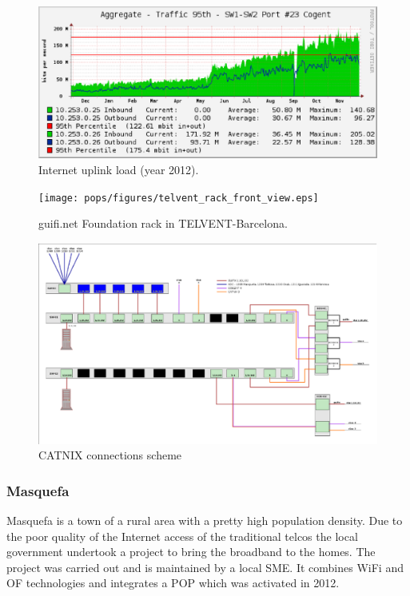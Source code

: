 \begin{figure}[htbp]
  \centering
  \includegraphics[scale=.65]{pops/figures/cogent_network_load2.eps} 
  \caption{Internet uplink load (year 2012).}
  \label{fig:cogent_load}
\end{figure}


\begin{figure}[htbp]
  \centering
  \texttt{[image: pops/figures/telvent\_rack\_front\_view.eps]} 
  \caption{guifi.net Foundation rack in TELVENT-Barcelona.}
  \label{fig:telvent_rack}
\end{figure}


\begin{figure}[htbp]
  \centering
  \includegraphics[scale=.75]{pops/figures/telvent_scheme.eps} 
  \caption{CATNIX connections scheme}
  \label{fig:telvent_scheme}
\end{figure}



\FloatBarrier
\subsubsection{Masquefa}

Masquefa is a town of a rural area with a pretty high population density. Due to the poor quality of the Internet access of the traditional telcos the local government undertook a project to bring the broadband to the homes. The project was carried out and is maintained by a local SME. It combines WiFi and OF technologies and integrates a POP which was activated in 2012.

